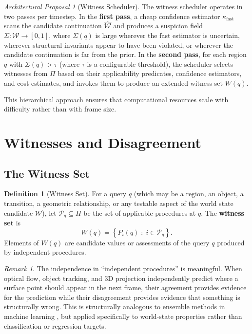 \documentclass[12pt,a4paper]{article}
\theoremstyle{plain}
\theoremstyle{definition}
\newtheorem{definition}[theorem]{Definition}
\theoremstyle{remark}
\newtheorem{remark}[theorem]{Remark}
\newtheorem{proposal}[theorem]{Architectural Proposal}
\begin{document}
\begin{proposal}[Witness Scheduler]
The witness scheduler operates in two passes per timestep. In the \textbf{first pass}, a cheap confidence estimator $\kappa_{\text{fast}}$ scans the candidate continuation $\hat{\mathcal{W}}$ and produces a suspicion field $\Sigma : \mathcal{W} \to [0,1]$, where $\Sigma(q)$ is large wherever the fast estimator is uncertain, wherever structural invariants appear to have been violated, or wherever the candidate continuation is far from the prior. In the \textbf{second pass}, for each region $q$ with $\Sigma(q) > \tau$ (where $\tau$ is a configurable threshold), the scheduler selects witnesses from $\Pi$ based on their applicability predicates, confidence estimators, and cost estimates, and invokes them to produce an extended witness set $W(q)$.
\end{proposal}

This hierarchical approach ensures that computational resources scale with difficulty rather than with frame size.

\section{Witnesses and Disagreement}
\label{sec:witnesses}

\subsection{The Witness Set}

\begin{definition}[Witness Set]
For a query $q$ (which may be a region, an object, a transition, a geometric relationship, or any testable aspect of the world state candidate $\hat{\mathcal{W}}$), let $\mathcal{P}_q \subseteq \Pi$ be the set of applicable procedures at $q$. The \textbf{witness set} is
\[
W(q) = \left\{ P_i(q) \;:\; i \in \mathcal{P}_q \right\}.
\]
Elements of $W(q)$ are candidate values or assessments of the query $q$ produced by independent procedures.
\end{definition}

\begin{remark}
The independence in ``independent procedures'' is meaningful. When optical flow, object tracking, and 3D projection independently predict where a surface point should appear in the next frame, their agreement provides evidence for the prediction while their disagreement provides evidence that something is structurally wrong. This is structurally analogous to ensemble methods in machine learning \cite{lakshminarayanan2017deep}, but applied specifically to world-state properties rather than classification or regression targets.
\end{remark}
\end{document}
